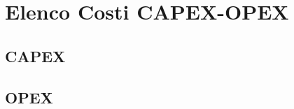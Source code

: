 \chapter[Elenco Costi CAPEX-OPEX]{Elenco Costi CAPEX-OPEX}

\section[CAPEX]{CAPEX}
	

\section[OPEX]{OPEX}
	